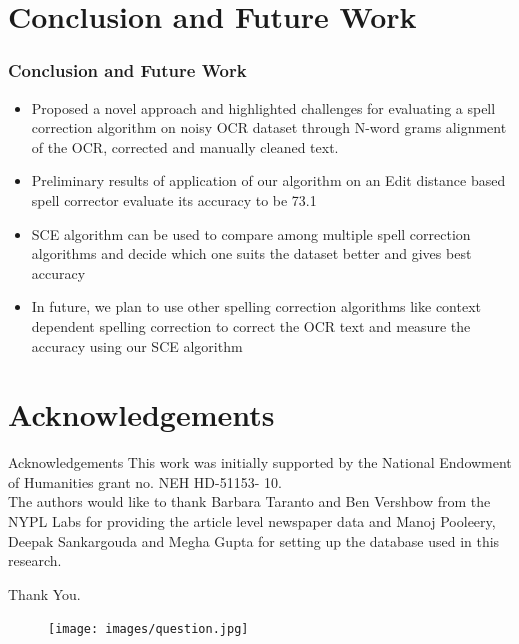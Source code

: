 \documentclass{beamer}
\begin{document}
\section{Conclusion and Future Work}
\begin{frame}
\frametitle{Conclusion and Future Work}
\begin{itemize}
 \justifying

\item
Proposed a novel approach and highlighted challenges for evaluating a spell correction algorithm on noisy OCR dataset through N-word grams alignment of the OCR, corrected and manually cleaned text.

\item
Preliminary results of application of our algorithm on an Edit distance based spell corrector evaluate its accuracy to be 73.1%

\item
SCE algorithm can be used to compare among multiple spell correction algorithms and decide which one suits the dataset better and gives best accuracy

\item
In future, we plan to use other spelling correction algorithms like context dependent spelling correction to correct the OCR text and
measure the accuracy using our SCE algorithm


\end{itemize}
\end{frame}

\section{Acknowledgements}
\begin{frame}
\begin{block}{Acknowledgements}
This work was initially supported by the National Endowment of Humanities grant no. NEH HD-51153- 10. \\
The authors would like to thank Barbara Taranto and Ben Vershbow from the NYPL Labs for providing the article level newspaper data and Manoj Pooleery, Deepak Sankargouda and Megha Gupta for setting up the database used in this research.
\end{block}
\end{frame}

\begin{frame}

\begin{center}
 
\Huge Thank You.\\ \vspace{0.2in}
\end{center}
\begin{figure}[ht]
\begin{center}
\texttt{[image: images/question.jpg]}

\end{center}
\end{figure}

\end{frame}
\end{document}
